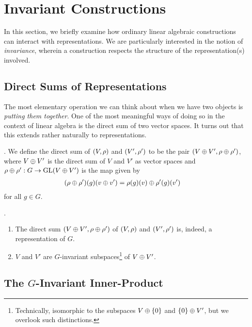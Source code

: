 \section{Invariant Constructions}

In this section, we briefly examine how ordinary linear algebraic constructions can interact with representations. We are particularly interested in the notion of \textit{invariance}, wherein a construction respects the structure of the representation(s) involved.

\subsection{Direct Sums of Representations}

The most elementary operation we can think about when we have two objects is \textit{putting them together}. One of the most meaningful ways of doing so in the context of linear algebra is the direct sum of two vector spaces. It turns out that this extends rather naturally to representations.

\begin{boxdefinition}
    . We define the direct sum of $\left( V,\rho \right)$ and $\left( V', \rho' \right)$ to be the pair $\left( V \oplus V', \rho \oplus \rho' \right)$, where $V \oplus V'$ is the direct sum of $V$ and $V'$ as vector spaces and $\rho \oplus \rho' : G \to \operatorname{GL}\!\left( V \oplus V' \right)$ is the map given by
    \begin{align*}
        \left( \rho \oplus \rho' \right)\!\left( g \right)\!\left( v \oplus v' \right) &= \rho(g)(v) \oplus \rho'(g)(v')
    \end{align*}
    for all $g \in G$.
\end{boxdefinition}

\begin{proposition}
    .
    \begin{enumerate}[label = \normalfont \arabic*., noitemsep]
        \item The direct sum $\left( V \oplus V', \rho \oplus \rho' \right)$ of $\left( V,\rho \right)$ and $\left( V', \rho' \right)$ is, indeed, a representation of $G$.
        \item $V$ and $V'$ are $G$-invariant subspaces\footnote{Technically, isomorphic to the subspaces $V \oplus \left\{ 0 \right\}$ and $\left\{ 0 \right\} \oplus V'$, but we overlook such distinctions.} of $V \oplus V'$.
    \end{enumerate}
\end{proposition}

\subsection{The $G$-Invariant Inner-Product}